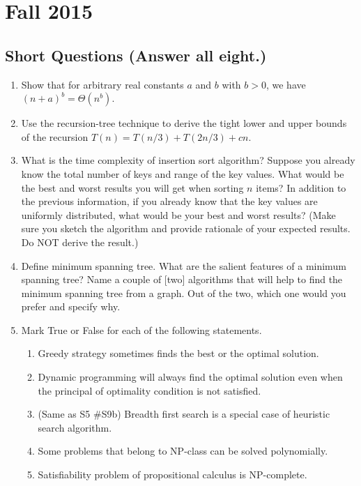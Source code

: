 \section{Fall 2015}

\subsection{Short Questions (Answer all eight.)}

\begin{enumerate}
	\item Show that for arbitrary real constants $a$ and $b$ with $b>0$, we have $(n+a)^b = \Theta(n^b)$.
	
	\item Use the recursion-tree technique to derive the tight lower and upper bounds of the recursion $T(n) = T(n/3) + T(2n/3) + cn$.

	\item What is the time complexity of insertion sort algorithm?  Suppose you already know the total number of keys and range of the key values.  What would be the best and worst results you will get when sorting $n$ items?  In addition to the previous information, if you already know that the key values are uniformly distributed, what would be your best and worst results?  (Make sure you sketch the algorithm and provide rationale of your expected results.  Do NOT derive the result.)

	\item Define minimum spanning tree.  What are the salient features of a minimum spanning tree?  Name a couple of [two] algorithms that will help to find the minimum spanning tree from a graph.  Out of the two, which one would you prefer and specify why.  
	
	\item Mark True or False for each of the following statements.  
	\begin{enumerate}[label=\alph*.]
		\item Greedy strategy sometimes finds the best or the optimal solution.
		\item Dynamic programming will always find the optimal solution even when the principal of optimality condition is not satisfied.
		\item (Same as S5 \#S9b) Breadth first search is a special case of heuristic search algorithm.
		\item Some problems that belong to NP-class can be solved polynomially.  
		\item Satisfiability problem of propositional calculus is NP-complete.
	\end{enumerate}
		

\end{enumerate}

